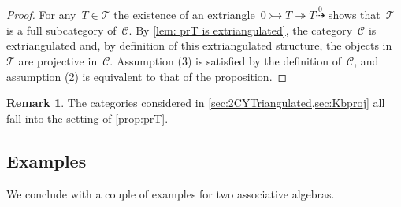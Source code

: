 \documentclass{amsart}
\theoremstyle{definition}
\newtheorem{remark}[theorem]{Remark}
\newcommand{\cat}{\mathcal{C}}
\newcommand{\tc}{\mathcal{T}}
\newcommand{\infl}{\rightarrowtail}
\newcommand{\defl}{\twoheadrightarrow}
\begin{document}
\begin{proof}
For any~$T\in\tc$ the existence of an extriangle~$0\infl T\defl T\overset{0}{\dashrightarrow}$ shows that~$\tc$ is a full subcategory of~$\cat$.
By \cref{lem: prT is extriangulated}, the category~$\cat$ is extriangulated and, by definition of this extriangulated structure, the objects in~$\tc$ are projective in~$\cat$.
Assumption (3) is satisfied by the definition of~$\cat$, and assumption (2) is equivalent to that of the proposition.
\end{proof}

\begin{remark}
 The categories considered in \cref{sec:2CYTriangulated,sec:Kbproj} all fall into the setting of \cref{prop:prT}.
\end{remark}


\subsection{Examples}

We conclude with a couple of examples for two associative algebras.


\end{document}
